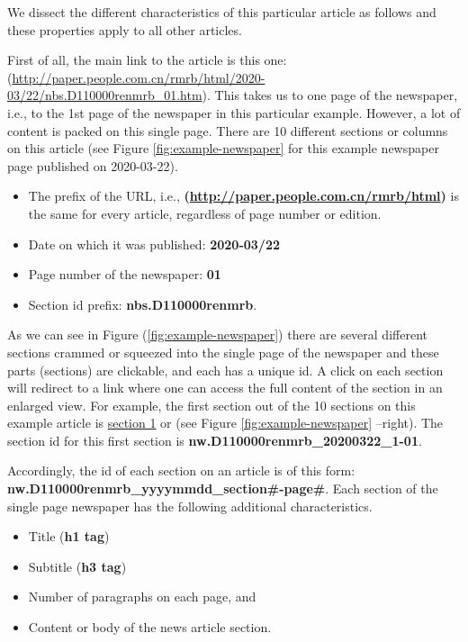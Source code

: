 \documentclass[12pt,a4paper]{article}
\begin{document}
We dissect the different characteristics of this particular article as follows and these properties apply to all other articles.

First of all, the main link to the article is this one: (\url{http://paper.people.com.cn/rmrb/html/2020-03/22/nbs.D110000renmrb_01.htm}). This takes us to one page of the newspaper, i.e., to the 1st page of the newspaper in this particular example. However, a lot of content is packed on this single page. There are 10 different sections or columns on this article (see Figure \ref{fig:example-newspaper} for this example newspaper page published on 2020-03-22).

\begin{itemize}
\item
  The prefix of the URL, i.e.,
  \textbf{(\url{http://paper.people.com.cn/rmrb/html})} is the same for every article, regardless of page number or edition.
\item
  Date on which it was published: \textbf{2020-03/22}
\item
  Page number of the newspaper: \textbf{01}
\item
  Section id prefix: \textbf{nbs.D110000renmrb}.
\end{itemize}

As we can see in Figure (\ref{fig:example-newspaper}) there are several different sections crammed or squeezed into the single page of the newspaper and these parts (sections) are clickable, and each has a unique id. A click on each section will redirect to a link where one can access the full content of the section in an enlarged view. For example, the first section out of the 10 sections on this example article is \href{http://paper.people.com.cn/rmrb/html/2020-03/22/nw.D110000renmrb_20200322_1-01.htm}{section 1} or (see Figure \ref{fig:example-newspaper} --right). The section id for this first section is \textbf{nw.D110000renmrb\_20200322\_1-01}.

Accordingly, the id of each section on an article is of this form:
\textbf{nw.D110000renmrb\_yyyymmdd\_section\#-page\#}. Each section of the single page newspaper has the following additional characteristics.

\begin{itemize}
\tightlist
\item
  Title (\textbf{h1 tag})
\item
  Subtitle (\textbf{h3 tag})
\item
  Number of paragraphs on each page, and
\item
  Content or body of the news article section.
\end{itemize}
\end{document}
